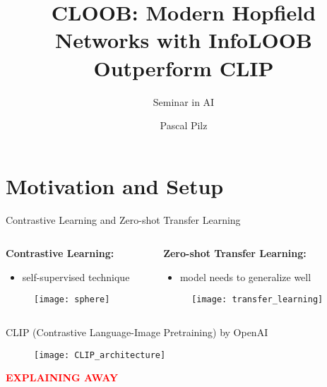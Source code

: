 \documentclass[utf8,aspectratio=169,ngerman,english,usenames,dvipsnames]{beamer}
\begin{document}
\title{CLOOB: Modern Hopfield Networks with InfoLOOB Outperform CLIP}
\subtitle{Seminar in AI}
\author{Pascal Pilz}
\date[\today]{} %

\maketitle

\section{Motivation and Setup}
    
\begin{frame}{Contrastive Learning and Zero-shot Transfer Learning}
    \pause
    \begin{columns}
        \begin{column}{0.375\textwidth}
            \textbf{Contrastive Learning:}
            \begin{itemize}
                \item self-supervised technique
            \end{itemize}
            \begin{figure}
                \centering
                \texttt{[image: sphere]}
            \end{figure}
        \end{column}
        \pause
        \begin{column}{0.625\textwidth}
            \textbf{Zero-shot Transfer Learning:}
            \begin{itemize}
                \item model needs to generalize well
            \end{itemize}
            \begin{figure}
                \centering
                \texttt{[image: transfer\_learning]}
            \end{figure}
        \end{column}
    \end{columns}
\end{frame}

\begin{frame}{CLIP (Contrastive Language-Image Pretraining) by OpenAI}
    \pause
    \begin{figure}
        \centering
        \texttt{[image: CLIP\_architecture]}
    \end{figure}
    \pause
    \vspace*{-28ex}
    \begin{center}
        {\begin{tcolorbox}[colback=white, colframe=black, enlarge top by=2mm, enlarge bottom by=2mm, width=0.65\linewidth]
            {\textcolor{red}{\Huge \textbf{EXPLAINING AWAY}}}
        \end{tcolorbox}}
    \end{center}
\end{frame}
\end{document}
